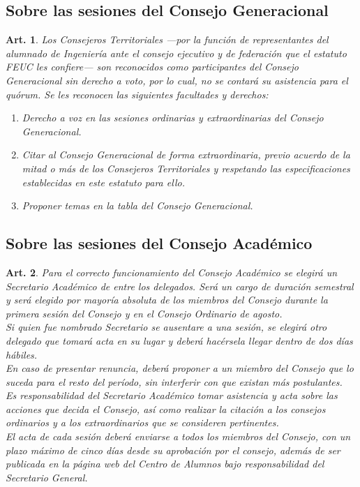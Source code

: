 \documentclass[letterpaper,11pt]{article}
\theoremstyle{plain}
\newtheorem{art}{Art.} %
\begin{document}
		\subsection*{Sobre las sesiones del Consejo Generacional}

			\begin{art}
				Los Consejeros Territoriales ---por la función de representantes del alumnado de Ingeniería ante el consejo ejecutivo y de federación que el estatuto FEUC les confiere--- son reconocidos como participantes del Consejo Generacional sin derecho a voto, por lo cual, no se contará su asistencia para el quórum. Se les reconocen las siguientes facultades y derechos:
				\begin{enumerate}
					\item Derecho a voz en las sesiones ordinarias y extraordinarias del Consejo Generacional.
					\item Citar al Consejo Generacional de forma extraordinaria, previo acuerdo de la mitad o más de los Consejeros Territoriales y respetando las especificaciones establecidas en este estatuto para ello.
					\item Proponer temas en la tabla del Consejo Generacional.
				\end{enumerate}
			\end{art}

		\subsection*{Sobre las sesiones del Consejo Académico}


			\begin{art}
				Para el correcto funcionamiento del Consejo Académico se elegirá un Secretario Académico de entre los delegados. Será un cargo de duración semestral y será elegido por mayoría absoluta de los miembros del Consejo durante la primera sesión del Consejo  y en el Consejo Ordinario de agosto.
				\\
				Si quien fue nombrado Secretario se ausentare a una sesión, se elegirá otro delegado que tomará acta en su lugar y deberá hacérsela llegar dentro de dos días hábiles.
				\\
				En caso de presentar renuncia, deberá proponer a un miembro del Consejo que lo suceda para el resto del período, sin interferir con que existan más postulantes.
				\\
				Es responsabilidad del Secretario Académico tomar asistencia y acta sobre las acciones que decida el Consejo, así como realizar la citación a los consejos ordinarios y a los extraordinarios que se consideren pertinentes.
				\\
				El acta de cada sesión deberá enviarse a todos los miembros del Consejo, con un plazo máximo de cinco días  desde su aprobación por el consejo, además de ser publicada en la página web del Centro de Alumnos bajo responsabilidad del Secretario General.
			\end{art}
\end{document}
